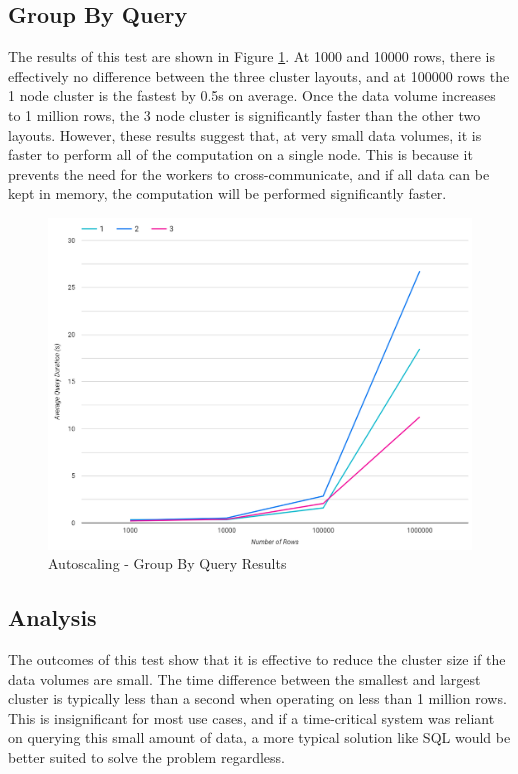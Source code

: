 \subsection{Group By Query}
The results of this test are shown in Figure \ref{fig:group-by-simple-autoscale-test}. At 1000 and 10000 rows, there is effectively no difference between the three cluster layouts, and at 100000 rows the 1 node cluster is the fastest by 0.5s on average. Once the data volume increases to 1 million rows, the 3 node cluster is significantly faster than the other two layouts. However, these results suggest that, at very small data volumes, it is faster to perform all of the computation on a single node. This is because it prevents the need for the workers to cross-communicate, and if all data can be kept in memory, the computation will be performed significantly faster.

\begin{figure}[ht]
	\centering
	\includegraphics[width=0.8\linewidth]{chapters/diagrams/testing/group-by-simple-autoscale-test}
	\caption{Autoscaling - Group By Query Results}
	\label{fig:group-by-simple-autoscale-test}
\end{figure}

\subsection{Analysis}
The outcomes of this test show that it is effective to reduce the cluster size if the data volumes are small. The time difference between the smallest and largest cluster is typically less than a second when operating on less than 1 million rows. This is insignificant for most use cases, and if a time-critical system was reliant on querying this small amount of data, a more typical solution like SQL would be better suited to solve the problem regardless.
